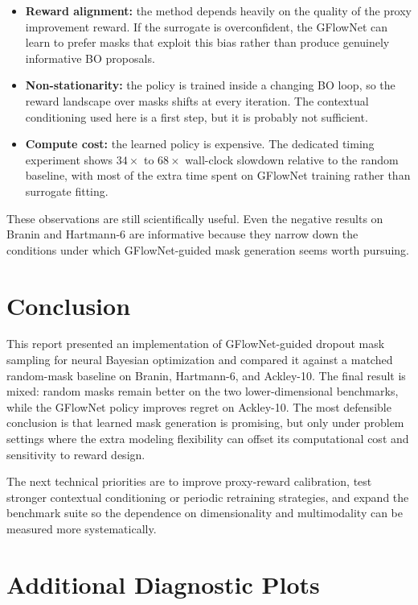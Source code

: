 \documentclass{article}
\begin{document}
\begin{itemize}
    \item \textbf{Reward alignment:} the method depends heavily on the quality of the proxy improvement reward. If the surrogate is overconfident, the GFlowNet can learn to prefer masks that exploit this bias rather than produce genuinely informative BO proposals.
    \item \textbf{Non-stationarity:} the policy is trained inside a changing BO loop, so the reward landscape over masks shifts at every iteration. The contextual conditioning used here is a first step, but it is probably not sufficient.
    \item \textbf{Compute cost:} the learned policy is expensive. The dedicated timing experiment shows $34\times$ to $68\times$ wall-clock slowdown relative to the random baseline, with most of the extra time spent on GFlowNet training rather than surrogate fitting.
\end{itemize}

These observations are still scientifically useful. Even the negative results on Branin and Hartmann-6 are informative because they narrow down the conditions under which GFlowNet-guided mask generation seems worth pursuing.

\section{Conclusion}

This report presented an implementation of GFlowNet-guided dropout mask sampling for neural Bayesian optimization and compared it against a matched random-mask baseline on Branin, Hartmann-6, and Ackley-10. The final result is mixed: random masks remain better on the two lower-dimensional benchmarks, while the GFlowNet policy improves regret on Ackley-10. The most defensible conclusion is that learned mask generation is promising, but only under problem settings where the extra modeling flexibility can offset its computational cost and sensitivity to reward design.

The next technical priorities are to improve proxy-reward calibration, test stronger contextual conditioning or periodic retraining strategies, and expand the benchmark suite so the dependence on dimensionality and multimodality can be measured more systematically.

\appendix

\section{Additional Diagnostic Plots}
\end{document}
